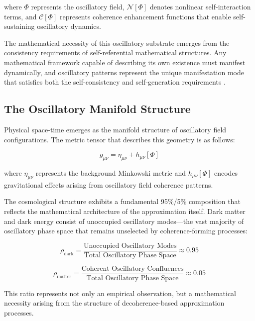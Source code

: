 \documentclass[12pt,a4paper]{article}
\begin{document}
where $\Phi$ represents the oscillatory field, $\mathcal{N}[\Phi]$ denotes nonlinear self-interaction terms, and $\mathcal{C}[\Phi]$ represents coherence enhancement functions that enable self-sustaining oscillatory dynamics.

The mathematical necessity of this oscillatory substrate emerges from the consistency requirements of self-referential mathematical structures. Any mathematical framework capable of describing its own existence must manifest dynamically, and oscillatory patterns represent the unique manifestation mode that satisfies both the self-consistency and self-generation requirements \cite{godel_incompleteness, tarski_undefinability}.

\subsection{The Oscillatory Manifold Structure}

Physical space-time emerges as the manifold structure of oscillatory field configurations. The metric tensor that describes this geometry is as follows:

\begin{equation}
g_{\mu\nu} = \eta_{\mu\nu} + h_{\mu\nu}[\Phi]
\end{equation}

where $\eta_{\mu\nu}$ represents the background Minkowski metric and $h_{\mu\nu}[\Phi]$ encodes gravitational effects arising from oscillatory field coherence patterns.

The cosmological structure exhibits a fundamental 95\%/5\% composition that reflects the mathematical architecture of the approximation itself. Dark matter and dark energy consist of unoccupied oscillatory modes—the vast majority of oscillatory phase space that remains unselected by coherence-forming processes:

\begin{equation}
\rho_{\text{dark}} = \frac{\text{Unoccupied Oscillatory Modes}}{\text{Total Oscillatory Phase Space}} \approx 0.95
\end{equation}

\begin{equation}
\rho_{\text{matter}} = \frac{\text{Coherent Oscillatory Confluences}}{\text{Total Oscillatory Phase Space}} \approx 0.05
\end{equation}

This ratio represents not only an empirical observation, but a mathematical necessity arising from the structure of decoherence-based approximation processes.
\end{document}
